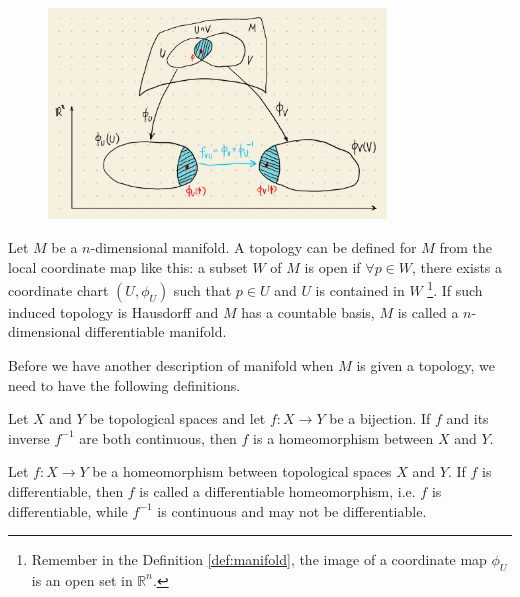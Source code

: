 \documentclass[11pt, a4paper]{book}
\begin{document}
\begin{figure}[htbp]
  \centering
  \includegraphics[width=0.8\textwidth, height=\textheight, keepaspectratio]{figures/manifold-draft}
  \caption{}
  \label{fig:manifold}
\end{figure}

\begin{Definition}
  Let $M$ be a $n$-dimensional manifold. A topology can be defined for $M$ from the local
  coordinate map like this: a subset $W$ of $M$ is open if $\forall p \in W$, there exists
  a coordinate chart $(U, \phi_U)$ such that $p \in U$ and $U$ is contained in $W$
  \footnote{Remember in the Definition \ref{def:manifold}, the image of a coordinate map
    $\phi_U$ is an open set in $\mathbb{R}^n$.}. If such induced topology is Hausdorff and
  $M$ has a countable basis, $M$ is called a $n$-dimensional differentiable manifold.
\end{Definition}

Before we have another description of manifold when $M$ is given a topology, we
need to have the following definitions.

\begin{Definition}[Homeomorphism]
  Let $X$ and $Y$ be topological spaces and let $f: X \rightarrow Y$ be a
  bijection. If $f$ and its inverse $f^{-1}$ are both continuous, then $f$ is a
  homeomorphism between $X$ and $Y$.
\end{Definition}


\begin{Definition}
  Let $f: X \rightarrow Y$ be a homeomorphism between topological spaces $X$ and $Y$. If
  $f$ is differentiable, then $f$ is called a differentiable homeomorphism, i.e. $f$ is
  differentiable, while $f^{-1}$ is continuous and may not be differentiable.
\end{Definition}
\end{document}
